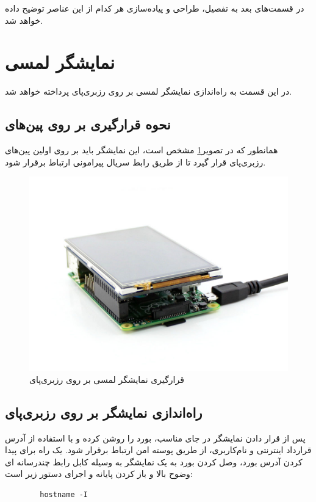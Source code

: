 در قسمت‌های بعد به تفصیل، طراحی و پیاده‌سازی هر کدام از این عناصر توضیح داده خواهد شد.

\section{نمایشگر لمسی}
در این قسمت به راه‌اندازی نمایشگر لمسی بر روی رزبری‌پای پرداخته خواهد شد.

\subsection{نحوه قرارگیری بر روی پین‌های }
همانطور که در تصویر\ref{spi} مشخص است، این نمایشگر باید بر روی اولین پین‌های  رزبری‌پای قرار گیرد تا از طریق رابط سریال پیرامونی ارتباط برقرار شود.
\begin{figure}[t!]
    \centering
    \includegraphics[scale=0.5]{figures/spi.jpg}
    \caption{قرارگیری نمایشگر لمسی بر روی رزبری‌پای }
    \label{spi}
\end{figure}

\subsection{راه‌اندازی نمایشگر بر روی رزبری‌پای}
پس از قرار دادن نمایشگر در جای مناسب، بورد را روشن کرده و با استفاده از آدرس  قرارداد اینترنتی و نام‌کاربری، از طریق پوسته امن ارتباط برقرار شود.
یک راه برای پیدا کردن آدرس بورد، وصل کردن بورد به یک نمایشگر به وسیله کابل رابط چندرسانه ای وضوح بالا و باز کردن پایانه و اجرای دستور زیر است:
\begin{latin}
    \begin{lstlisting}
        hostname -I
    \end{lstlisting}
\end{latin}

